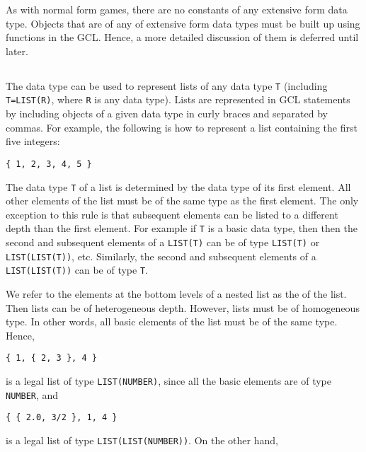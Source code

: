 As with normal form games, there are no constants of any extensive form
data type.  Objects that are of any of extensive form data types must
be built up using functions in the GCL.  Hence, a more detailed
discussion of them is deferred until later.

\subsection{}

The  data type can be used to represent lists of any
data type \verb+T+ (including \verb+T=LIST(R)+, where \verb+R+ is any
data type).  Lists are represented in GCL statements by including
objects of a given data type in curly braces and separated by commas.
For example, the following is how to represent a list containing the
first five integers:

\begin{verbatim}
{ 1, 2, 3, 4, 5 }
\end{verbatim}

\noindent 
The data type \verb+T+ of a list is determined by the data type of its
first element.  All other elements of the list must be of the same
type as the first element.  The only exception to this rule is that
subsequent elements can be listed to a different depth than the first
element.  For example if \verb+T+ is a basic data type, then then the
second and subsequent elements of a \verb+LIST(T)+ can be of type
\verb+LIST(T)+ or \verb+LIST(LIST(T))+, etc.  Similarly, the second
and subsequent elements of a \verb+LIST(LIST(T))+ can be of type
\verb+T+.  

We refer to the elements at the bottom levels of a nested list as the
 of the list.  Then lists can be of heterogeneous
depth.  However, lists must be of homogeneous type. In other words,
all basic elements of the list must be of the same type.  Hence,

\begin{verbatim}
{ 1, { 2, 3 }, 4 }
\end{verbatim}

\noindent 
is a legal list of type \verb+LIST(NUMBER)+, since all the basic
elements are of type {\tt NUMBER}, and 

\begin{verbatim}
{ { 2.0, 3/2 }, 1, 4 }
\end{verbatim}

\noindent 
is a legal list of type \verb+LIST(LIST(NUMBER))+.  On the other
hand, 

